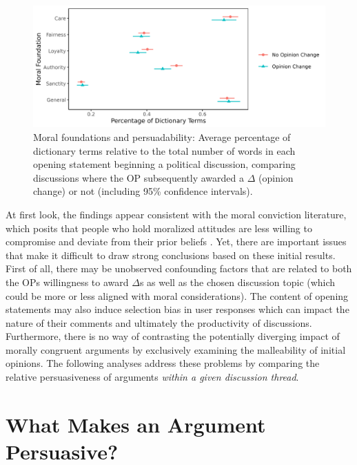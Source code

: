 \begin{figure}[ht]
\centering
\includegraphics{fig3-persuadability_political.png}
\caption[Moral foundations and persuadability]{Moral foundations and persuadability: Average percentage of dictionary terms relative to the total number of words in each opening statement beginning a political discussion, comparing discussions where the OP subsequently awarded a $\Delta$ (opinion change) or not (including 95\% confidence intervals).}\label{fig:persuadability}
\end{figure}

At first look, the findings appear consistent with the moral conviction literature, which posits that people who hold moralized attitudes are less willing to compromise and deviate from their prior beliefs \citep[e.g.,][]{skitka2005moral,ryan2014reconsidering,ryan2017no}. Yet, there are important issues that make it difficult to draw strong conclusions based on these initial results. First of all, there may be unobserved confounding factors that are related to both the OPs willingness to award $\Delta$s as well as the chosen discussion topic (which could be more or less aligned with moral considerations). The content of opening statements may also induce selection bias in user responses which can impact the nature of their comments and ultimately the productivity of discussions. Furthermore, there is no way of contrasting the potentially diverging impact of morally congruent arguments by exclusively examining the malleability of initial opinions. The following analyses address these problems by comparing the relative persuasiveness of arguments \textit{within a given discussion thread}.


\section{What Makes an Argument Persuasive?}

